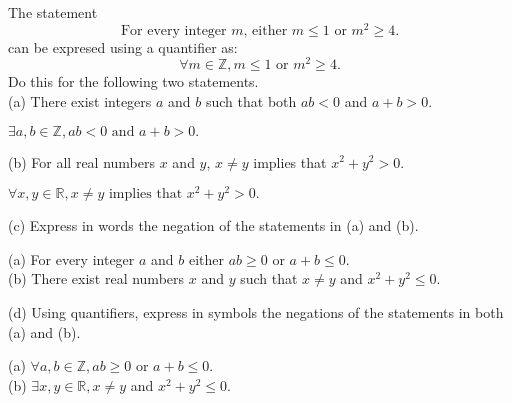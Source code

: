 \documentclass[12pt]{article}
\newcommand{\Z}{\mathbb{Z}}
\newenvironment{problem}[2][Problem]{\begin{trivlist}
		\item[\hskip \labelsep {\bfseries #1}\hskip \labelsep {\bfseries #2.}]}{\end{trivlist}}
\newenvironment{solution}[2][Solution]{\begin{trivlist}
		\item[\hskip \labelsep {\bfseries #1}\hskip \labelsep {\bfseries #2.}]}{\end{trivlist}}
\begin{document}
\begin{problem}{71}
	The statement
	\begin{equation*}
		\text{For every integer } m \text{, either } m\leq 1 \text{ or } m^{2} \geq 4. 
	\end{equation*}
	can be expresed using a quantifier as:
	\begin{equation*}
		\forall m \in \Z,m\leq 1 \text{ or } m^{2} \geq 4.
	\end{equation*}
Do this for the following two statements.\\

(a) There exist integers $a$ and $b$ such that both $ab < 0$ and $a+b>0.$
\begin{solution}{a}
	$\exists a,b \in \Z, ab<0 \text{ and } a+b>0.$
\end{solution}

(b) For all real numbers $x$ and $y$, $x\neq y$ implies that $x^{2} + y^{2} > 0$.
\begin{solution}{b}
	$\forall x,y \in \mathbb{R}, x\neq y \text{ implies that } x^{2} + y^{2} >0.$
\end{solution}

(c) Express in words the negation of the statements in (a) and  (b). 
\begin{solution}{c}
	(a) For every integer $a$ and $b$ either $ab \geq 0$ or $a+b \leq 0.$\\
	(b) There exist real numbers $x$ and $y$ such that $x \neq y$ and $x^{2} + y^{2} \leq 0.$
\end{solution}

(d) Using quantifiers, express in symbols the negations of the statements in both (a) and (b).
\begin{solution}{d}
	(a) $\forall a,b \in \Z, ab \geq 0$ or $a+b\leq 0.$\\
	(b) $\exists x,y \in \mathbb{R}, x\neq y$ and $x^{2}+y^{2} \leq 0.$
\end{solution}
\end{problem}
\end{document}
